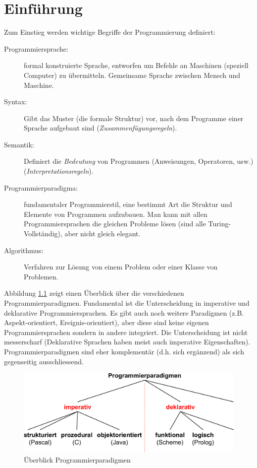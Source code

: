 \chapter{Einführung}

Zum Einstieg werden wichtige Begriffe der Programmierung definiert:

\begin{description}
	\item[Programmiersprache:] formal konstruierte Sprache, entworfen um Befehle an Maschinen (speziell Computer) zu übermitteln. Gemeinsame Sprache zwischen Mensch und Maschine.
	\item[Syntax:] Gibt das Muster (die formale Struktur) vor, nach dem Programme einer Sprache aufgebaut sind (\textit{Zusammenfügungsregeln}).
	\item[Semantik:] Definiert die \textit{Bedeutung} von Programmen (Anweisungen, Operatoren, usw.) (\textit{Interpretationsregeln}).
	\item[Programmierparadigma:] fundamentaler Programmierstil, eine bestimmt Art die Struktur und Elemente von Programmen aufzubauen. Man kann mit allen Programmiersprachen die gleichen Probleme lösen (sind alle Turing-Vollständig), aber nicht gleich elegant.
	\item[Algorithmus:] Verfahren zur Lösung von einem Problem oder einer Klasse von Problemen.
\end{description}

Abbildung \ref{fig:programmierparadigmen} zeigt einen Überblick über die verschiedenen Programmierparadigmen. Fundamental ist die Unterscheidung in imperative und deklarative Programmiersprachen. Es gibt auch noch weitere Paradigmen (z.B. Aspekt-orientiert, Ereignis-orientiert), aber diese sind keine eigenen Programmiersprachen sondern in andere integriert. Die Unterscheidung ist nicht messerscharf (Deklarative Sprachen haben meist auch imperative Eigenschaften). Programmierparadigmen sind eher komplementär (d.h.
sich ergänzend) als sich gegenseitig ausschliessend.

\begin{figure}
\centering
\includegraphics[width=0.7\linewidth]{fig/programmierparadigmen}
\caption{Überblick Programmierparadigmen}
\label{fig:programmierparadigmen}
\end{figure}

